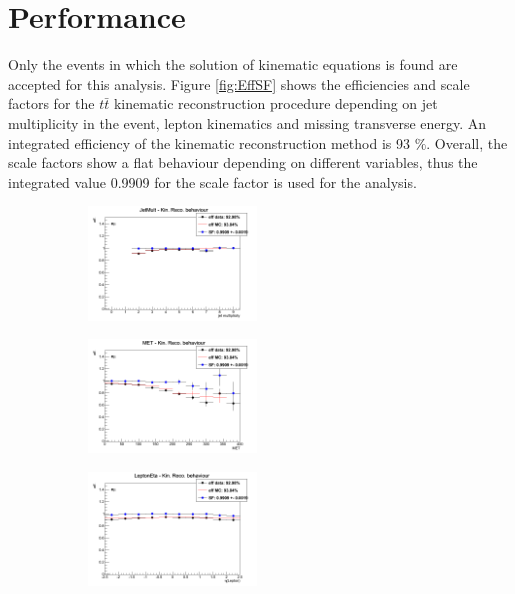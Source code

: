 \section{Performance}\label{sec:kinRecPerf}

Only the events in which the solution of kinematic equations is found are accepted for this analysis. 
Figure \ref{fig:EffSF} shows the efficiencies and scale factors for the $t\bar{t}$ kinematic reconstruction procedure depending on jet multiplicity in the event, 
lepton kinematics and missing transverse energy. An integrated efficiency of the kinematic reconstruction method is 93 $\%$. Overall, the scale factors 
show a flat behaviour depending on different variables, thus the integrated value 0.9909 for the scale factor  is used for the analysis.

\begin{figure}[t]
\centering
\begin{subfigure}
  \centering
  \includegraphics[width=0.49\textwidth]{05_kinReco/plots/eff_SF/KinRecoEff_JetMult.png}
\end{subfigure}
\begin{subfigure}
  \centering
  \includegraphics[width=0.49\textwidth]{05_kinReco/plots/eff_SF/KinRecoEff_MET.png}
\end{subfigure}
\begin{subfigure}
  \centering
  \includegraphics[width=0.49\textwidth]{05_kinReco/plots/eff_SF/KinRecoEff_LeptonEta.png}

\end{subfigure}
\end{figure}
